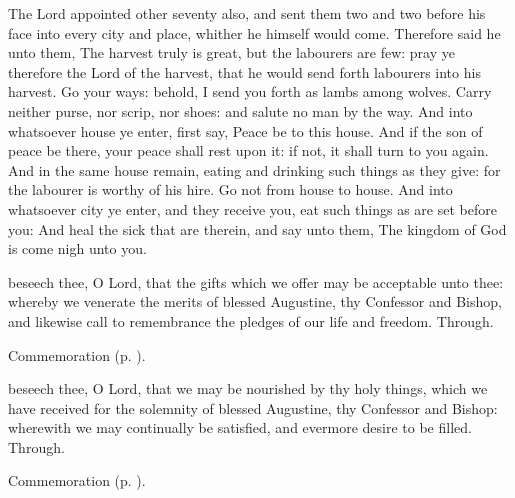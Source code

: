 
 The Lord appointed other seventy also, and sent them two and two before his face into every city and place, whither he himself would come. Therefore said he unto them, The harvest truly is great, but the labourers are few: pray ye therefore the Lord of the harvest, that he would send forth labourers into his harvest. Go your ways: behold, I send you forth as lambs among wolves. Carry neither purse, nor scrip, nor shoes: and salute no man by the way. And into whatsoever house ye enter, first say, Peace be to this house. And if the son of peace be there, your peace shall rest upon it: if not, it shall turn to you again. And in the same house remain, eating and drinking such things as they give: for the labourer is worthy of his hire. Go not from house to house. And into whatsoever city ye enter, and they receive you, eat such things as are set before you: And heal the sick that are therein, and say unto them, The kingdom of God is come nigh unto you.


\secret
{} beseech thee, O Lord, that the gifts which we offer may be acceptable unto thee: whereby we venerate the merits of blessed Augustine, thy Confessor and Bishop, and likewise call to remembrance the pledges of our life and freedom. Through.

\begin{rubric}
	Commemoration  (p. \pageref{EleutheriusSecret}).
\end{rubric}


\postcommunion
{} beseech thee, O Lord, that we may be nourished by thy holy things, which we have received for the solemnity of blessed Augustine, thy Confessor and Bishop: wherewith we may continually be satisfied, and evermore desire to be filled. Through.

\begin{rubric}
	Commemoration  (p. \pageref{EleutheriusPostcommunion}).
\end{rubric}

